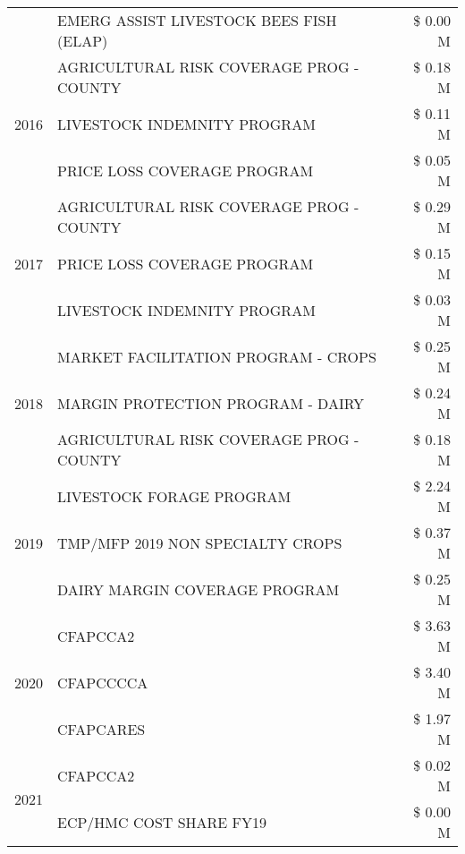 \begin{tabular}{llr}
 & EMERG ASSIST LIVESTOCK BEES FISH (ELAP) & \$ 0.00 M \\
\cline{1-3}
\multirow[t]{3}{*}{2016} & AGRICULTURAL RISK COVERAGE PROG - COUNTY & \$ 0.18 M \\
 & LIVESTOCK INDEMNITY PROGRAM & \$ 0.11 M \\
 & PRICE LOSS COVERAGE PROGRAM & \$ 0.05 M \\
\cline{1-3}
\multirow[t]{3}{*}{2017} & AGRICULTURAL RISK COVERAGE PROG - COUNTY & \$ 0.29 M \\
 & PRICE LOSS COVERAGE PROGRAM & \$ 0.15 M \\
 & LIVESTOCK INDEMNITY PROGRAM & \$ 0.03 M \\
\cline{1-3}
\multirow[t]{3}{*}{2018} & MARKET FACILITATION PROGRAM - CROPS & \$ 0.25 M \\
 & MARGIN PROTECTION PROGRAM - DAIRY & \$ 0.24 M \\
 & AGRICULTURAL RISK COVERAGE PROG - COUNTY & \$ 0.18 M \\
\cline{1-3}
\multirow[t]{3}{*}{2019} & LIVESTOCK FORAGE PROGRAM & \$ 2.24 M \\
 & TMP/MFP 2019 NON SPECIALTY CROPS & \$ 0.37 M \\
 & DAIRY MARGIN COVERAGE PROGRAM & \$ 0.25 M \\
\cline{1-3}
\multirow[t]{3}{*}{2020} & CFAPCCA2 & \$ 3.63 M \\
 & CFAPCCCCA & \$ 3.40 M \\
 & CFAPCARES & \$ 1.97 M \\
\cline{1-3}
\multirow[t]{2}{*}{2021} & CFAPCCA2 & \$ 0.02 M \\
 & ECP/HMC COST SHARE FY19 & \$ 0.00 M \\
\cline{1-3}
\bottomrule
\end{tabular}
